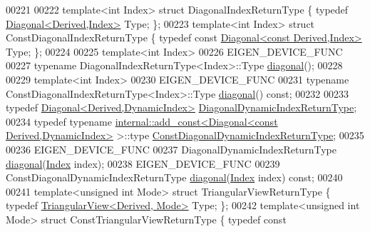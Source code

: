 \begin{DoxyCode}
00221 
00222     \textcolor{keyword}{template}<\textcolor{keywordtype}{int} Index> \textcolor{keyword}{struct }DiagonalIndexReturnType \{ \textcolor{keyword}{typedef} 
      \hyperlink{group___core___module_class_eigen_1_1_diagonal}{Diagonal<Derived,Index>} Type; \};
00223     \textcolor{keyword}{template}<\textcolor{keywordtype}{int} Index> \textcolor{keyword}{struct }ConstDiagonalIndexReturnType \{ \textcolor{keyword}{typedef} \textcolor{keyword}{const} 
      \hyperlink{group___core___module_class_eigen_1_1_diagonal}{Diagonal<const Derived,Index>} Type; \};
00224 
00225     \textcolor{keyword}{template}<\textcolor{keywordtype}{int} Index>
00226     EIGEN\_DEVICE\_FUNC
00227     \textcolor{keyword}{typename} DiagonalIndexReturnType<Index>::Type \hyperlink{group___core___module_ab5768147536273eb2dbdfa389cfd26a3}{diagonal}();
00228 
00229     \textcolor{keyword}{template}<\textcolor{keywordtype}{int} Index>
00230     EIGEN\_DEVICE\_FUNC
00231     \textcolor{keyword}{typename} ConstDiagonalIndexReturnType<Index>::Type \hyperlink{group___core___module_ab5768147536273eb2dbdfa389cfd26a3}{diagonal}() \textcolor{keyword}{const};
00232 
00233     \textcolor{keyword}{typedef} \hyperlink{group___core___module_class_eigen_1_1_diagonal}{Diagonal<Derived,DynamicIndex>} 
      \hyperlink{group___core___module_class_eigen_1_1_diagonal}{DiagonalDynamicIndexReturnType};
00234     \textcolor{keyword}{typedef} \textcolor{keyword}{typename} \hyperlink{struct_eigen_1_1internal_1_1add__const}{internal::add\_const<Diagonal<const Derived,DynamicIndex>}
       >::type \hyperlink{group___core___module_class_eigen_1_1_transpose}{ConstDiagonalDynamicIndexReturnType};
00235 
00236     EIGEN\_DEVICE\_FUNC
00237     DiagonalDynamicIndexReturnType \hyperlink{group___core___module_ab5768147536273eb2dbdfa389cfd26a3}{diagonal}(\hyperlink{namespace_eigen_a62e77e0933482dafde8fe197d9a2cfde}{Index} index);
00238     EIGEN\_DEVICE\_FUNC
00239     ConstDiagonalDynamicIndexReturnType \hyperlink{group___core___module_ab5768147536273eb2dbdfa389cfd26a3}{diagonal}(\hyperlink{namespace_eigen_a62e77e0933482dafde8fe197d9a2cfde}{Index} index) \textcolor{keyword}{const};
00240 
00241     \textcolor{keyword}{template}<\textcolor{keywordtype}{unsigned} \textcolor{keywordtype}{int} Mode> \textcolor{keyword}{struct }TriangularViewReturnType \{ \textcolor{keyword}{typedef} 
      \hyperlink{group___core___module_class_eigen_1_1_triangular_view}{TriangularView<Derived, Mode>} Type; \};
00242     \textcolor{keyword}{template}<\textcolor{keywordtype}{unsigned} \textcolor{keywordtype}{int} Mode> \textcolor{keyword}{struct }ConstTriangularViewReturnType \{ \textcolor{keyword}{typedef} \textcolor{keyword}{const} 

\end{DoxyCode}
